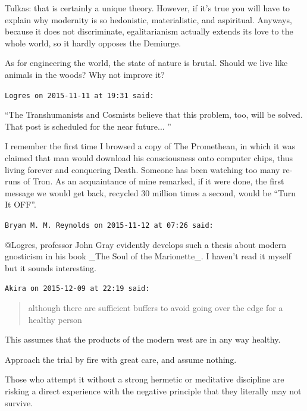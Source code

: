 \begin{footnotesize}
\begin{sffamily}
Tulkas: that is certainly a unique theory. However, if it's true you will have to explain why modernity is so hedonistic, materialistic, and aspiritual. Anyways, because it does not discriminate, egalitarianism actually extends its love to the whole world, so it hardly opposes the Demiurge.

As for engineering the world, the state of nature is brutal. Should we live like animals in the woods? Why not improve it?

\hfill

\texttt{Logres on 2015-11-11 at 19:31 said:}

``The Transhumanists and Cosmists believe that this problem, too, will be solved. That post is scheduled for the near future... ''

I remember the first time I browsed a copy of The Promethean, in which it was claimed that man would download his consciousness onto computer chips, thus living forever and conquering Death. Someone has been watching too many re-runs of Tron. As an acquaintance of mine remarked, if it were done, the first message we would get back, recycled 30 million times a second, would be ``Turn It OFF''.

\hfill

\texttt{Bryan M. M. Reynolds on 2015-11-12 at 07:26 said:}

@Logres, professor John Gray evidently develops such a thesis about modern gnosticism in his book \_The Soul of the Marionette\_. I haven't read it myself but it sounds interesting.

\hfill

\texttt{Akira on 2015-12-09 at 22:19 said:}

\begin{quote}

although there are sufficient buffers to avoid going over the edge for a healthy person
\end{quote}


This assumes that the products of the modern west are in any way healthy.

Approach the trial by fire with great care, and assume nothing.

Those who attempt it without a strong hermetic or meditative discipline are risking a direct experience with the negative principle that they literally may not survive.


\hfill

\end{sffamily}
\end{footnotesize}


